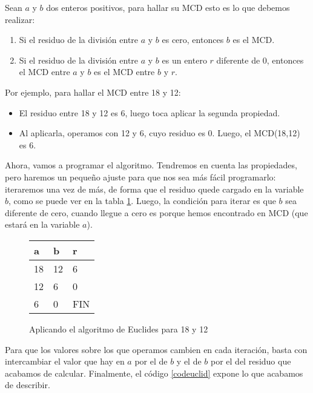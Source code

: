Sean $a$ y $b$ dos enteros positivos, para hallar su MCD esto es lo que debemos realizar: 

\begin{enumerate}
	\item Si el residuo de la división entre $a$ y $b$ es cero, entonces $b$ es el MCD.
	\item Si el residuo de la división entre $a$ y $b$ es un entero $r$ diferente de 0, entonces el MCD entre $a$ y $b$ es el MCD entre $b$ y $r$.
\end{enumerate}



Por ejemplo, para hallar el MCD entre 18 y 12:

\begin{itemize}
	\item El residuo entre 18 y 12 es 6, luego toca aplicar la segunda propiedad.
	\item Al aplicarla, operamos con 12 y 6, cuyo residuo es 0. Luego, el MCD(18,12) es 6. 	
\end{itemize}

Ahora, vamos a programar el algoritmo. Tendremos en cuenta las propiedades, pero haremos un pequeño ajuste para que nos sea más fácil programarlo: iteraremos una vez de más, de forma que el residuo quede cargado en la variable $b$, como se puede ver en la tabla \ref{euclidej}. Luego, la condición para iterar es que $b$ sea diferente de cero, cuando llegue a cero es porque hemos encontrado en MCD (que estará en la variable $a$).

\newpage

\begin{figure}[h!]
	\centering
\begin{tabular}{| p{1cm} | p{1cm} | p{1cm} |}\hline
	\textbf{a} & 	\textbf{b} & 	\textbf{r} \\ \hline
	18 & 12 & 6 \\ 
	12 & 6 & 0 \\ 
	6 & 0 & FIN \\ \hline
\end{tabular}

\caption{Aplicando el algoritmo de Euclides para 18 y 12}
\label{euclidej}
\end{figure}

Para que los valores sobre los que operamos cambien en cada iteración, basta con intercambiar el valor que hay en $a$ por el de $b$ y el de $b$ por el del residuo que acabamos de calcular. Finalmente, el código \ref{codeuclid} expone lo que acabamos de describir. \\

